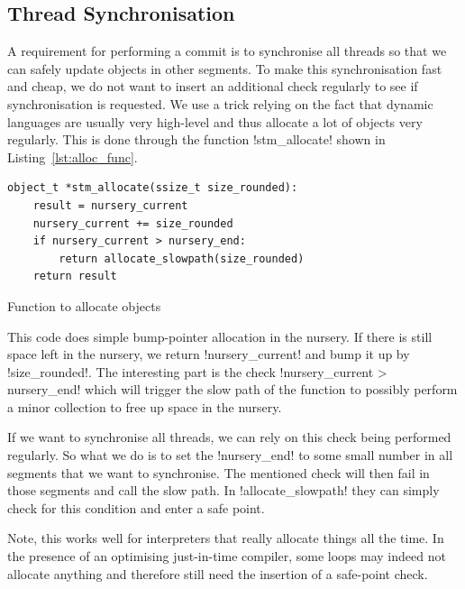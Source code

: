 \documentclass{sigplanconf}
\makeatletter
\renewcommand\lstinline[1][]{%
  \Collectverb{\@@myverb}%
}
\def\@@myverb#1{%
    \begingroup
    \fboxsep=0.2em
    \colorbox{verylightgray}{\oldlstinline|#1|}%
    \endgroup
}
\makeatother
\begin{document}
\subsection{Thread Synchronisation\label{subsub:sync}}

A requirement for performing a commit is to synchronise all threads so
that we can safely update objects in other segments. To make this
synchronisation fast and cheap, we do not want to insert an additional
check regularly to see if synchronisation is requested. We
use a trick relying on the fact that dynamic languages are usually
very high-level and thus allocate a lot of objects very regularly.
This is done through the function \lstinline!stm_allocate!  shown
in Listing~\ref{lst:alloc_func}.

\begin{code}[h]
\begin{lstlisting}
object_t *stm_allocate(ssize_t size_rounded):
    result = nursery_current
	nursery_current += size_rounded
	if nursery_current > nursery_end:
		return allocate_slowpath(size_rounded)
	return result
\end{lstlisting}
\caption{Function to allocate objects\label{lst:alloc_func}}
\end{code}

This code does simple bump-pointer allocation in the nursery. If there
is still space left in the nursery, we return
\lstinline!nursery_current!  and bump it up by
\lstinline!size_rounded!.  The interesting part is the check
\lstinline!nursery_current > nursery_end!  which will trigger the slow
path of the function to possibly perform a minor collection
to free up space in the nursery.

If we want to synchronise all threads, we can rely on this check being
performed regularly. So what we do is to set the
\lstinline!nursery_end!  to some small number in all segments that we
want to synchronise. The mentioned check will then fail in those
segments and call the slow path. In \lstinline!allocate_slowpath!
they can simply check for this condition and enter a safe point.

Note, this works well for interpreters that really allocate things
all the time. In the presence of an optimising just-in-time compiler,
some loops may indeed not allocate anything and therefore still need
the insertion of a safe-point check.

\end{document}
